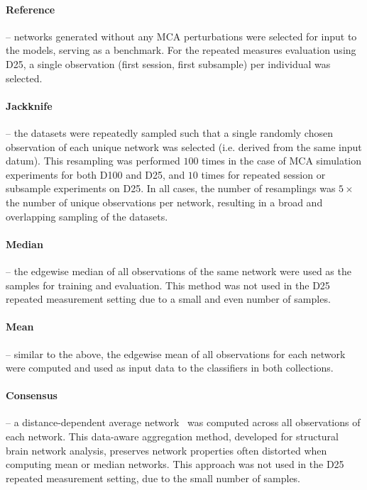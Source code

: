 \documentclass[fleqn,10pt]{SelfArx} %
\begin{document}
\paragraph{Reference} – networks generated without any MCA perturbations were selected for input to the models, serving
as a benchmark. For the repeated measures evaluation using D25, a single observation (first session, first subsample)
per individual was selected.

\paragraph{Jackknife} – the datasets were repeatedly sampled such that a single randomly chosen observation of each
unique network was selected (i.e. derived from the same input datum). This resampling was performed $100$ times in the
case of MCA simulation experiments for both D100 and D25, and $10$ times for repeated session or subsample experiments
on D25. In all cases, the number of resamplings was $5\times$ the number of unique observations per network, resulting
in a broad and overlapping sampling of the datasets.

\paragraph{Median} – the edgewise median of all observations of the same network were used as the samples for training
and evaluation. This method was not used in the D25 repeated measurement setting due to a small and even number of
samples.

\paragraph{Mean} – similar to the above, the edgewise mean of all observations for each network were computed and used
as input data to the classifiers in both collections.

\paragraph{Consensus} – a distance-dependent average network~\cite{Betzel2018-eo} was computed across all observations
of each network. This data-aware aggregation method, developed for structural brain network analysis, preserves network
properties often distorted when computing mean or median networks. This approach was not used in the D25 repeated
measurement setting, due to the small number of samples.
\end{document}
